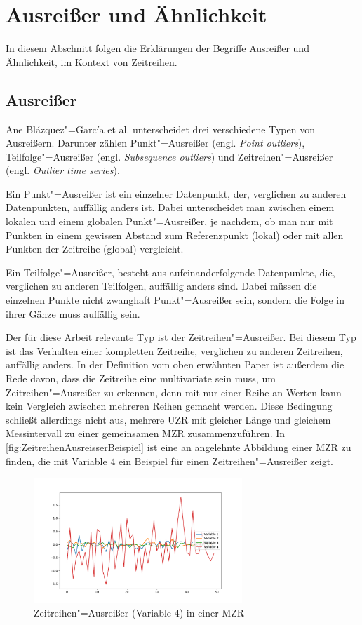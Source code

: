 \section{Ausreißer und Ähnlichkeit}
In diesem Abschnitt folgen die Erklärungen der Begriffe Ausreißer und Ähnlichkeit, im Kontext von Zeitreihen.
\subsection{Ausreißer}
Ane Blázquez"=García et al. \cite[Ch. 2.2]{reviewOutlierDetection} unterscheidet drei verschiedene Typen von Ausreißern. Darunter zählen Punkt"=Ausreißer (engl. \textit{Point outliers}), Teilfolge"=Ausreißer (engl. \textit{Subsequence outliers}) und Zeitreihen"=Ausreißer (engl. \textit{Outlier time series}).

Ein Punkt"=Ausreißer ist ein einzelner Datenpunkt, der, verglichen zu anderen Datenpunkten, auffällig anders ist. Dabei unterscheidet man zwischen einem lokalen und einem globalen Punkt"=Ausreißer, je nachdem, ob man nur mit Punkten in einem gewissen Abstand zum Referenzpunkt (lokal) oder mit allen Punkten der Zeitreihe (global) vergleicht.

Ein Teilfolge"=Ausreißer, besteht aus aufeinanderfolgende Datenpunkte, die, verglichen zu anderen Teilfolgen, auffällig anders sind. Dabei müssen die einzelnen Punkte nicht zwanghaft Punkt"=Ausreißer sein, sondern die Folge in ihrer Gänze muss auffällig sein. 

Der für diese Arbeit relevante Typ ist der Zeitreihen"=Ausreißer. Bei diesem Typ ist das Verhalten einer kompletten Zeitreihe, verglichen zu anderen Zeitreihen, auffällig anders. In der Definition vom oben erwähnten Paper \cite{reviewOutlierDetection} ist außerdem die Rede davon, dass die Zeitreihe eine multivariate sein muss, um Zeitreihen"=Ausreißer zu erkennen, denn mit nur einer Reihe an Werten kann kein Vergleich zwischen mehreren Reihen gemacht werden. Diese Bedingung schließt allerdings nicht aus, mehrere \acs{UZR} mit gleicher Länge und gleichem Messintervall zu einer gemeinsamen \acs{MZR} zusammenzuführen. In \autoref{fig:ZeitreihenAusreisserBeispiel} ist eine an \cite[Fig. 5]{reviewOutlierDetection} angelehnte Abbildung einer \acs{MZR} zu finden, die mit Variable 4 ein Beispiel für einen Zeitreihen"=Ausreißer zeigt.
\begin{figure}[bth] 
  \centering
  \includegraphics[width=0.7\textwidth]{Graphics/TimeSeriesOutlierExample.pdf}
  \caption{Zeitreihen"=Ausreißer (Variable 4) in einer \acs{MZR}}
  \label{fig:ZeitreihenAusreisserBeispiel}
\end{figure}

